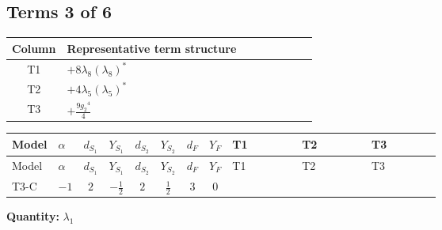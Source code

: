 \documentclass[8pt]{article}
\begin{document}
\begin{landscape}
\subsection*{Terms 3 of 6}
\begin{center}
\begin{tabular}{@{}c >{\raggedright\arraybackslash}p{0.82\linewidth}@{}}
\toprule
Column & Representative term structure \\
\midrule
T1 & \(\displaystyle +8 {\lambda_{8}} \left({\lambda_{8}}\right)^{*}\) \\
\midrule
T2 & \(\displaystyle +4 {\lambda_5} \left({\lambda_5}\right)^{*}\) \\
\midrule
T3 & \(\displaystyle +\frac{9 {g_2}^4}{4}\) \\
\midrule
\bottomrule
\end{tabular}
\end{center}
\smallskip
\tiny
\begin{longtable}{@{}llcccccc >{\raggedright\arraybackslash}p{0.21\linewidth} >{\raggedright\arraybackslash}p{0.21\linewidth} >{\raggedright\arraybackslash}p{0.21\linewidth}@{}}
\toprule
Model & $\alpha$ & $d_{S_1}$ & $Y_{S_1}$ & $d_{S_2}$ & $Y_{S_2}$ & $d_F$ & $Y_F$ & T1 & T2 & T3 \\
\midrule
\endfirsthead
\toprule
Model & $\alpha$ & $d_{S_1}$ & $Y_{S_1}$ & $d_{S_2}$ & $Y_{S_2}$ & $d_F$ & $Y_F$ & T1 & T2 & T3 \\
\midrule
\endhead
T3-C & $-1$ & $2$ & $-\frac{1}{2}$ & $2$ & $\frac{1}{2}$ & $3$ & $0$ & \scriptsize\adjustbox{max width=\linewidth}{$\begin{gathered} +8 {\lambda_{8}} \left({\lambda_{8}}\right)^{*}\end{gathered}$} & \scriptsize\adjustbox{max width=\linewidth}{$\begin{gathered} +4 {\lambda_5} \left({\lambda_5}\right)^{*}\end{gathered}$} & \scriptsize\adjustbox{max width=\linewidth}{$\begin{gathered} +\frac{9 {g_2}^4}{4}\end{gathered}$} \\
\midrule
\bottomrule
\end{longtable}
\clearpage
\noindent\textbf{Quantity: }$\lambda_1$\par\smallskip

\end{landscape}
\end{document}

